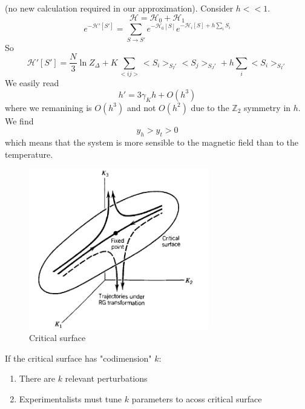 \documentclass[a4paper]{book}
\theoremstyle{definition}
\theoremstyle{remark}
\begin{document}
(no new calculation required in our approximation). Consider $h << 1$. 
\begin{equation}
    \mathcal{H} = \mathcal{H}_0 + \mathcal{H}_1
\end{equation}
\begin{equation}
    e^{-\mathcal{H}'[S']} = \sum_{S \rightarrow S'} e^{-\mathcal{H}_0[S]}e^{-\mathcal{H}_i[S] + h \sum_i S_i}
\end{equation}
So 
\begin{equation}
    \mathcal{H}'[S'] = \frac{N}{3}\ln Z_{\Delta} + K \sum_{<ij>}<S_i>_{S_I'}<S_j>_{S_J'} + h\sum _i <S_i>_{S_I'}
\end{equation}
We easily read 
\begin{equation}
    h' = 3\gamma_K h + O(h^3)
\end{equation}
where we remanining is $O(h^3)$ and not  $O(h^2)$ due to the $\mathbb{Z}_2$ symmetry in $h$. We find 
\begin{equation}
    y_h > y_t > 0
\end{equation}
which means that the system is more sensible to the magnetic field than to the temperature. \par \medskip 
\begin{figure}
    \centering
    \includegraphics[width=0.7\textwidth]{criticalsf}
    \caption{Critical surface}
\end{figure}

If the critical surface has "codimension" $k$: 
\begin{enumerate}
    \item There are $k$ relevant perturbations 
    \item Experimentalists must tune $k$ parameters to acoss critical surface
\end{enumerate}
\end{document}
